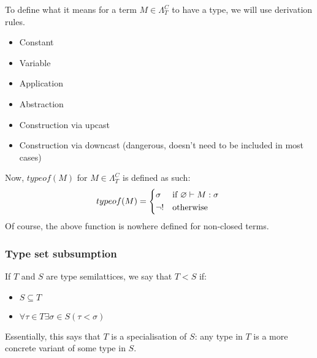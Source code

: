 \documentclass[main.tex]{subfiles}
\begin{document}
\begin{defn}
    To define what it means for a term $M \in \Lambda_T^C$ to have a type,
    we will use derivation rules.
    \begin{itemize}
        \item Constant
        \item Variable
        \item Application
        \item Abstraction
        \item Construction via upcast
        \item Construction via downcast (dangerous, doesn't need to be included in most cases)
    \end{itemize}

    Now, $typeof(M)$ for $M \in \Lambda_T^C$ is defined as such:
    \[
        typeof(M) =
        \begin{cases*}
            \sigma & if $\varnothing \vdash M : \sigma$ \\
            \neg ! & otherwise
        \end{cases*}
    \]
    Of course, the above function is nowhere defined for non-closed terms.
\end{defn}

\subsubsection{Type set subsumption}
\begin{defn}
    If $T$ and $S$ are type semilattices, we say that $T \less S$ if:
    \begin{itemize}
        \item $S \subseteq T$
        \item $\forall \tau \in T \exists \sigma \in S ( \tau \less \sigma )$
    \end{itemize}

    Essentially, this says that $T$ is a specialisation of $S$: any type in
    $T$ is a more concrete variant of some type in $S$.
\end{defn}
\end{document}

